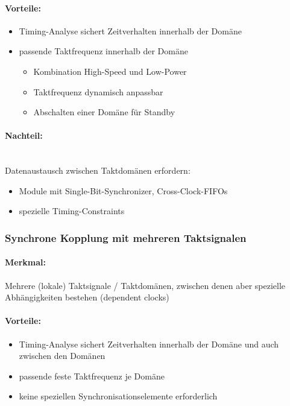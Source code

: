 		\paragraph{Vorteile:}
		\begin{itemize}
			\item Timing-Analyse sichert Zeitverhalten innerhalb der Domäne
			\item passende Taktfrequenz innerhalb der Domäne
			\begin{itemize}
				\item Kombination High-Speed und Low-Power
				\item Taktfrequenz dynamisch anpassbar
				\item Abschalten einer Domäne für Standby
			\end{itemize}
		\end{itemize}
		\paragraph{Nachteil:}\hfill\\
		Datenaustausch zwischen Taktdomänen erfordern:
		\begin{itemize}
			\item Module mit Single-Bit-Synchronizer, Cross-Clock-FIFOs
			\item spezielle Timing-Constraints
		\end{itemize}
	
	\subsubsection{Synchrone Kopplung mit mehreren Taktsignalen}
		\paragraph{Merkmal:} Mehrere (lokale) Taktsignale / Taktdomänen, zwischen denen aber spezielle Abhängigkeiten bestehen (dependent clocks)
		\paragraph{Vorteile:}
		\begin{itemize}
			\item Timing-Analyse sichert Zeitverhalten innerhalb der Domäne und auch zwischen den Domänen
			\item passende feste Taktfrequenz je Domäne
			\item keine speziellen Synchronisationselemente erforderlich
		\end{itemize}

